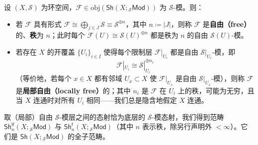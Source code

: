 \begin{Def}
设 $(X,\mathcal{S})$ 为环空间，$\mathcal{F}\in\text{obj}(\mathsf{Sh}(X;{}_\mathcal{S}\mathsf{Mod}))$ 为 $\mathcal{S}$-模。则：
\begin{itemize}[leftmargin=0.5cm]
	\item 若 $\mathcal{F}$ 具有形式 $\mathcal{F}\cong\bigoplus_{j\in J}\mathcal{S}\equiv\mathcal{S}^{\oplus n}$，其中 $n\coloneqq |J|$，则称 $\mathcal{F}$ 是\textbf{自由（free）}的、\textbf{秩}为 $n$；此时每个 $\mathcal{F}(U)\cong\mathcal{S}(U)^{\oplus n}$ 都是秩为 $n$ 的自由 $\mathcal{S}(U)$-模。
	
	\item 若存在 $X$ 的开覆盖 $\{U_i\}_{i\in I}$ 使得每个限制层 $\mathcal{F}|_{U_i}$ 都是自由 $\mathcal{S}|_{U_i}$-模，即
	\[
	\mathcal{F}|_{U_i}\cong\mathcal{S}|_{U_i}^{\oplus n_i}
	\]
	（等价地，若每个 $x\in X$ 都有邻域 $U_x\subset X$ 使 $\mathcal{F}|_{U_x}$ 是自由 $\mathcal{S}|_{U_x}$-模），则称 $\mathcal{F}$ 是\textbf{局部自由（locally free）}的；其中 $n_i$ 是 $\mathcal{F}$ 在 $U_i$ 上的秩，可能为无穷，且当 $X$ 连通时对所有 $U_i$ 相同——我们总是隐含地假定 $X$ 连通。
\end{itemize}
取（局部）自由 $\mathcal{S}$-模层之间的态射恰为底层的 $\mathcal{S}$-模态射，我们得到范畴 $\mathsf{Sh}^\mathsf{lf}_n(X;{}_\mathcal{S}\mathsf{Mod})$ 与 $\mathsf{Sh}^\mathsf{f}_n(X;{}_\mathcal{S}\mathsf{Mod})$（其中 $n$ 表示秩，除另行声明外 $<\infty$）。它们是 $\mathsf{Sh}(X;{}_\mathcal{S}\mathsf{Mod})$ 的全子范畴。
\end{Def}

